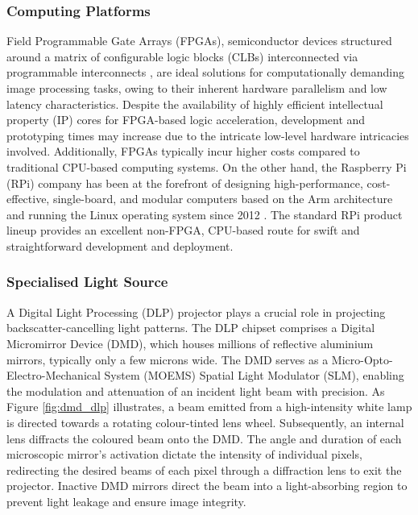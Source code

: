 \subsubsection{Computing Platforms}
Field Programmable Gate Arrays (FPGAs), semiconductor devices structured around a matrix of configurable logic blocks (CLBs) interconnected via programmable interconnects \cite{WhatFPGAField}, are ideal solutions for computationally demanding image processing tasks, owing to their inherent hardware parallelism and low latency characteristics. Despite the availability of highly efficient intellectual property (IP) cores for FPGA-based logic acceleration, development and prototyping times may increase due to the intricate low-level hardware intricacies involved. Additionally, FPGAs typically incur higher costs compared to traditional CPU-based computing systems. On the other hand, the Raspberry Pi (RPi) company has been at the forefront of designing high-performance, cost-effective, single-board, and modular computers based on the Arm architecture and running the Linux operating system since 2012 \cite{raspberrypiltdRaspberryPiUs}. The standard RPi product lineup provides an excellent non-FPGA, CPU-based route for swift and straightforward development and deployment.

\subsubsection{Specialised Light Source}

A Digital Light Processing (DLP) projector plays a crucial role in projecting backscatter-cancelling light patterns. The DLP chipset comprises a Digital Micromirror Device (DMD), which houses millions of reflective aluminium mirrors, typically only a few microns wide. The DMD serves as a Micro-Opto-Electro-Mechanical System (MOEMS) Spatial Light Modulator (SLM), enabling the modulation and attenuation of an incident light beam with precision. As Figure \ref{fig:dmd_dlp} illustrates, a beam emitted from a high-intensity white lamp is directed towards a rotating colour-tinted lens wheel. Subsequently, an internal lens diffracts the coloured beam onto the DMD. The angle and duration of each microscopic mirror's activation dictate the intensity of individual pixels, redirecting the desired beams of each pixel through a diffraction lens to exit the projector. Inactive DMD mirrors direct the beam into a light-absorbing region to prevent light leakage and ensure image integrity.

